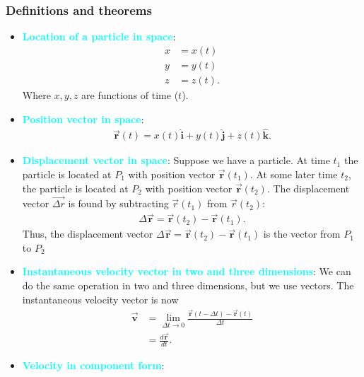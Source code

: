 \documentclass{report}
\begin{document}
    \subsubsection{Definitions and theorems}
    \begin{itemize}
        \item \textbf{\textcolor{cyan}{Location of a particle in space}}:
            \begin{align*}
                x &= x(t) \\
                y &= y(t) \\
                z &= z(t)
            .\end{align*}
            Where $x,y,z$ are functions of time ($t$). 
        \item \textbf{\textcolor{cyan}{Position vector in space}}:
            \begin{align*}
                \vec{\mathbf{r}}(t) = x(t)\hat{\mathbf{i}} + y(t)\hat{\mathbf{j}} + z(t)\hat{\mathbf{k}}
            .\end{align*}
        \item \textbf{\textcolor{cyan}{Displacement vector in space}}: 
            Suppose we have a particle. At time $t_{1}$ the particle is located at $P_{1}$ with position vector $\vec{\mathbf{r}}(t_{1})$. At some later time $t_{2}$, the particle is located at $P_{2}$ with position vector $\vec{\mathbf{r}}(t_{2})$. The displacement vector $\vec{\Delta r}$ is found by subtracting $\vec{r}(t_1)$ from $\vec{r}(t_2)$:
            \begin{align*}
                \Delta \vec{\mathbf{r}} = \vec{\mathbf{r}}(t_{2}) - \vec{\mathbf{r}}(t_{1})
            .\end{align*}
            Thus, the displacement vector $\Delta \vec{\mathbf{r}} = \vec{\mathbf{r}}(t_{2}) - \vec{\mathbf{r}}(t_{1})$ is the vector from $P_{1}$ to $P_{2}$
        \item \textbf{\textcolor{cyan}{Instantaneous velocity vector in two and three dimensions}}: We can do the same operation in two and three dimensions, but we use vectors. The instantaneous velocity vector is now
            \begin{align*}
                \vec{\mathbf{v}} &= \lim\limits_{\Delta t \to 0}{\frac{\vec{\mathbf{r}}(t - \Delta t)-\vec{\mathbf{r}}(t)}{\Delta t}} \\
                &=\frac{d\vec{\mathbf{r}}}{dt}
            .\end{align*}
        \item \textbf{\textcolor{cyan}{Velocity in component form}}:

\end{itemize}
\end{document}
